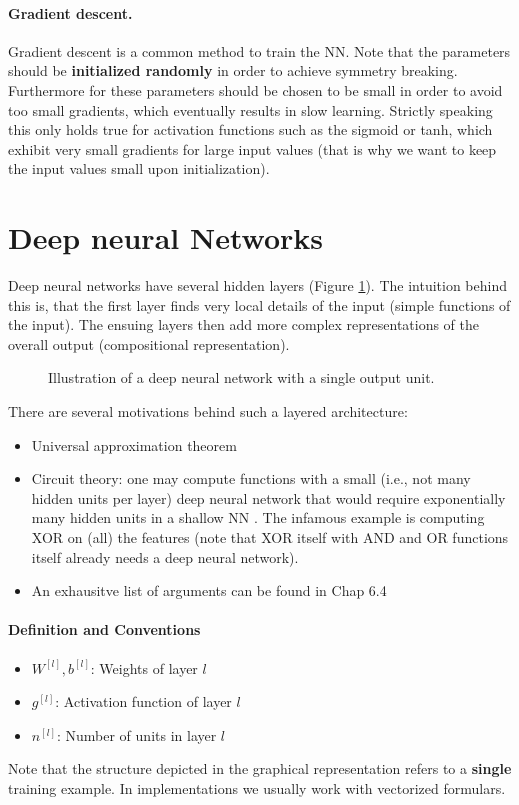 \documentclass[12pt,a4paper]{article}
\begin{document}
\paragraph{Gradient descent.} Gradient descent is a common method to train the NN. Note that the parameters should be \textbf{initialized  randomly} in order to achieve symmetry breaking. Furthermore for these parameters should be chosen to be small in order to avoid too small gradients, which eventually results in slow learning. Strictly speaking this only holds true for activation functions such as the sigmoid or tanh, which exhibit very small gradients for large input values (that is why we want to keep the input values small upon initialization). 

\section{Deep neural Networks}
Deep neural networks have several hidden layers (Figure \ref{fig:deep_neural_net}). The intuition behind this is, that the first layer finds very local details of the input (simple functions of the input). The ensuing layers then add more complex representations of the overall output (compositional representation).
\begin{figure}
	
	\caption{Illustration of a  deep neural network with a single output unit.}
	\label{fig:deep_neural_net}
\end{figure}
There are several motivations behind such a layered architecture:
\begin{itemize} 
\item Universal approximation theorem 	
\item Circuit theory: one may compute functions with a small (i.e., not many hidden units per layer) deep neural network that would require exponentially many hidden units in a shallow NN \cite{2014arXiv1402.1869M}. The infamous example is computing XOR on (all) the features (note that XOR itself with AND and OR functions itself already needs a deep neural network).
\item An exhausitve list of arguments can be found in \cite{Goodfellow:2016:DL} Chap 6.4

\end{itemize}
\paragraph{Definition and Conventions}
\begin{itemize}	\setlength\itemsep{0em}
	\item $W^{[l]}, b^{[l]}$: Weights of layer $l$
	\item $g^{[l]}$: Activation function of layer $l$
	\item $n^{[l]}$: Number of units in layer $l$
\end{itemize}
Note that the structure depicted in the graphical representation refers to a \textbf{single} training example. In implementations we usually work with vectorized formulars.
\end{document}
